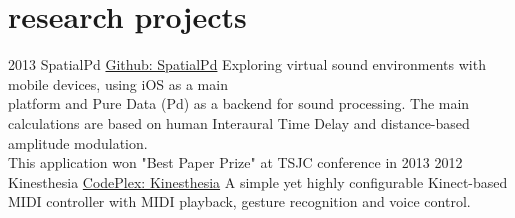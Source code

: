 \documentclass[]{friggeri-cv}
\begin{document}
\section{research projects}
\begin{entrylist}
  \entry
    {2013}
    {SpatialPd}
    {\href{https://github.com/Apolotary/SpatialPd}{Github: SpatialPd}}
    {Exploring virtual sound environments with mobile devices, using iOS as a main\\
    platform and Pure Data (Pd) as a backend for sound processing. The main\\
    calculations are based on human Interaural Time Delay and distance-based amplitude modulation.\\
    This application won "Best Paper Prize" at TSJC conference in 2013}
  \entry
    {2012}
    {Kinesthesia}
    {\href{https://kinesthesia.codeplex.com/}{CodePlex: Kinesthesia}}
    {A simple yet highly configurable Kinect-based MIDI controller with MIDI playback, gesture recognition and voice control.}
\end{entrylist}
%
%
\end{document}
